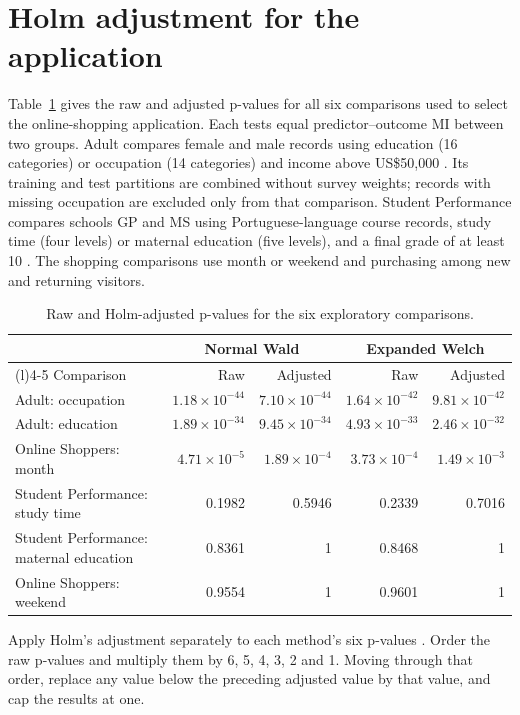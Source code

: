 \section{Holm adjustment for the application}
\label{sec:application-holm}

Table~\ref{tab:application-holm} gives the raw and adjusted p-values for
all six comparisons used to select the online-shopping application.
Each tests equal predictor--outcome MI between two groups. Adult compares
female and male records using education (16 categories) or occupation
(14 categories) and income above US\$50,000 \citep{becker1996}. Its
training and test partitions are combined without survey weights;
records with missing occupation are excluded only from that comparison.
Student Performance compares schools GP and MS using Portuguese-language
course records, study time (four levels) or maternal education (five levels),
and a final grade of at least 10 \citep{cortez2008}. The shopping
comparisons use month or weekend and purchasing among new and returning visitors.

\begin{table}[H]
\centering
\small
\caption{Raw and Holm-adjusted p-values for the six exploratory comparisons.}
\label{tab:application-holm}
\setlength{\tabcolsep}{4pt}
\begin{tabularx}{\textwidth}{@{}>{\raggedright\arraybackslash}Xrrrr@{}}
\toprule
& \multicolumn{2}{c}{Normal Wald} & \multicolumn{2}{c}{Expanded Welch}\\
\cmidrule(lr){2-3}\cmidrule(l){4-5}
Comparison & Raw & Adjusted & Raw & Adjusted\\
\midrule
Adult: occupation & \(1.18\times10^{-44}\) & \(7.10\times10^{-44}\) & \(1.64\times10^{-42}\) & \(9.81\times10^{-42}\)\\
Adult: education & \(1.89\times10^{-34}\) & \(9.45\times10^{-34}\) & \(4.93\times10^{-33}\) & \(2.46\times10^{-32}\)\\
Online Shoppers: month & \(4.71\times10^{-5}\) & \(1.89\times10^{-4}\) & \(3.73\times10^{-4}\) & \(1.49\times10^{-3}\)\\
Student Performance: study time & 0.1982 & 0.5946 & 0.2339 & 0.7016\\
Student Performance: maternal education & 0.8361 & 1 & 0.8468 & 1\\
Online Shoppers: weekend & 0.9554 & 1 & 0.9601 & 1\\
\bottomrule
\end{tabularx}
\end{table}

Apply Holm's adjustment separately to each method's six p-values
\citep{holm1979}. Order the raw p-values and multiply them by 6, 5, 4,
3, 2 and 1. Moving through that order, replace any value below the
preceding adjusted value by that value, and cap the results at one.
